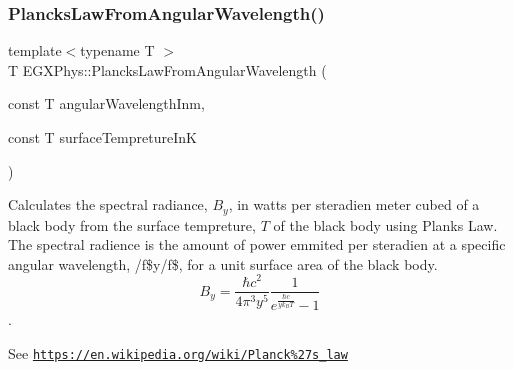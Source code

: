 \subsubsection{\texorpdfstring{Plancks\+Law\+From\+Angular\+Wavelength()}{PlancksLawFromAngularWavelength()}}
{\footnotesize\ttfamily template$<$typename T $>$ \\
T E\+G\+X\+Phys\+::\+Plancks\+Law\+From\+Angular\+Wavelength (\begin{DoxyParamCaption}\item[{const T}]{angular\+Wavelength\+Inm,  }\item[{const T}]{surface\+Tempreture\+InK }\end{DoxyParamCaption})}



Calculates the spectral radiance, $B_{y}$, in watts per steradien meter cubed of a black body from the surface tempreture, $T$ of the black body using Plank\textquotesingle{}s Law. The spectral radience is the amount of power emmited per steradien at a specific angular wavelength, /f\$y/f\$, for a unit surface area of the black body. \[ B_{y} = \dfrac{\hbar c^2}{4\pi^3y^5} \dfrac{1}{e^{\frac{\hbar c}{y k_B T}} - 1} \]. 

See \href{https://en.wikipedia.org/wiki/Planck%27s_law}{\tt https\+://en.\+wikipedia.\+org/wiki/\+Planck\%27s\+\_\+law}


